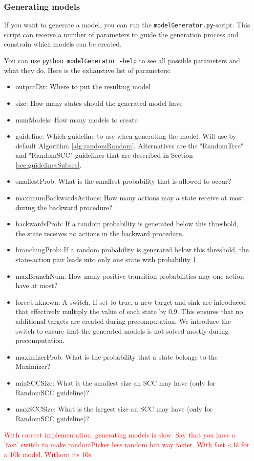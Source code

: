 \subsubsection*{Generating models}
If you want to generate a model, you can run the \texttt{modelGenerator.py}-script.
This script can receive a number of parameters to guide the generation process and constrain which models can be created.

You can use \texttt{python modelGenerator -help} to see all possible parameters and what they do.
Here is the exhaustive list of parameters:
\begin{itemize} \label{list:params}
    \item outputDir: Where to put the resulting model
    \item size: How many states should the generated model have
    \item numModels: How many models to create
    \item guideline: Which guideline to use when generating the model. Will use by default Algorithm \ref{alg:randomRandom}.
    Alternatives are the "RandomTree" and "RandomSCC" guidelines that are described in Section \ref{sec:guidelinesSubsec}.
    \item smallestProb: What is the smallest probability that is allowed to occur?
    \item maximumBackwardsActions: How many actions may a state receive at most during the backward procedure?
    \item backwardsProb: If a random probability is generated below this threshold, the state receives no actions in the backward procedure.
    \item branchingProb: If a random probability is generated below this threshold, the state-action pair leads into only one state with probability 1.
    \item maxBranchNum: How many positive transition probabilities may one action have at most?
    \item forceUnknown: A switch. If set to true, a new target and sink are introduced that effectively multiply the value of each state by 0.9.
    This ensures that no additional targets are created during precomputation. 
    We introduce the switch to ensure that the generated models is not solved mostly during precomputation.
    \item maximizerProb: What is the probability that a state belongs to the Maximizer?
    \item minSCCSize: What is the smallest size an SCC may have (only for RandomSCC guideline)?
    \item maxSCCSize: What is the largest size an SCC may have (only for RandomSCC guideline)?
\end{itemize}
\textcolor{red}{With correct implementation, generating models is slow. Say that you have a 'fast' switch to make randomPicker less random but way faster.
With fast <1ŝ for a 10k model. Without its 10s}

